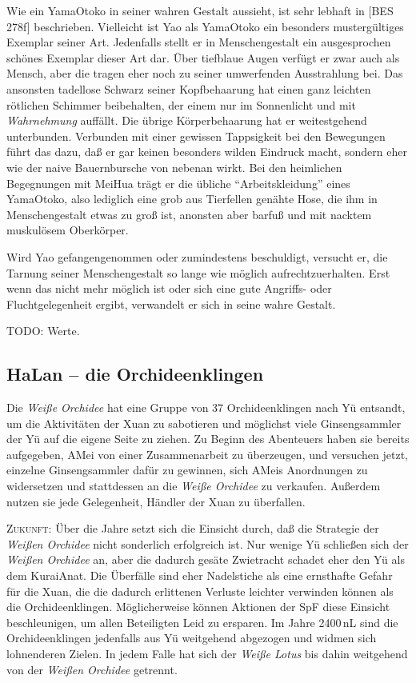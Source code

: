 \documentclass[
a4paper,
twoside,
DIV=calc,
BCOR=4mm,
fontsize=9pt,
twocolumn=on,
titlepage=on,
parskip=half
]{scrartcl}
\begin{document}
Wie ein YamaOtoko in seiner wahren Gestalt aussieht, ist sehr lebhaft
in [BES\,278f] beschrieben. Vielleicht ist Yao als YamaOtoko ein
besonders mustergültiges Exemplar seiner Art. Jedenfalls stellt er in
Menschengestalt ein ausgesprochen schönes Exemplar dieser Art
dar. Über tiefblaue Augen verfügt er zwar auch als Mensch, aber die
tragen eher noch zu seiner umwerfenden Ausstrahlung bei. Das ansonsten
tadellose Schwarz seiner Kopfbehaarung hat einen ganz leichten
rötlichen Schimmer beibehalten, der einem nur im Sonnenlicht und mit
\emph{Wahrnehmung} auffällt. Die übrige Körperbehaarung hat er
weitestgehend unterbunden. Verbunden mit einer gewissen Tappsigkeit
bei den Bewegungen führt das dazu, daß er gar keinen besonders wilden
Eindruck macht, sondern eher wie der naive Bauernbursche von nebenan
wirkt. Bei den heimlichen Begegnungen mit MeiHua trägt er die übliche
"`Arbeitskleidung"' eines YamaOtoko, also lediglich eine grob aus
Tierfellen genähte Hose, die ihm in Menschengestalt etwas zu groß ist,
anonsten aber barfuß und mit nacktem muskulösem Oberkörper.

Wird Yao gefangengenommen oder zumindestens beschuldigt, versucht er,
die Tarnung seiner Menschengestalt so lange wie möglich
aufrechtzuerhalten. Erst wenn das nicht mehr möglich ist oder sich
eine gute Angriffs- oder Fluchtgelegenheit ergibt, verwandelt er sich
in seine wahre Gestalt.

TODO: Werte.

\subsection{HaLan -- die Orchideenklingen}

Die \emph{Weiße Orchidee} hat eine Gruppe von 37 Orchideenklingen nach
Yü entsandt, um die Aktivitäten der Xuan zu sabotieren und möglichst
viele Ginsengsammler der Yü auf die eigene Seite zu ziehen. Zu Beginn
des Abenteuers haben sie bereits aufgegeben, AMei von einer
Zusammenarbeit zu überzeugen, und versuchen jetzt, einzelne
Ginsengsammler dafür zu gewinnen, sich AMeis Anordnungen zu
widersetzen und stattdessen an die \emph{Weiße Orchidee} zu
verkaufen. Außerdem nutzen sie jede Gelegenheit, Händler der Xuan zu
überfallen.

\textsc{Zukunft:} Über die Jahre setzt sich die Einsicht durch, daß
die Strategie der \emph{Weißen Orchidee} nicht sonderlich erfolgreich
ist. Nur wenige Yü schließen sich der \emph{Weißen Orchidee} an, aber
die dadurch gesäte Zwietracht schadet eher den Yü als dem KuraiAnat.
Die Überfälle sind eher Nadelstiche als eine ernsthafte Gefahr für die
Xuan, die die dadurch erlittenen Verluste leichter verwinden können als
die Orchideenklingen. Möglicherweise können Aktionen der SpF diese
Einsicht beschleunigen, um allen Beteiligten Leid zu ersparen. Im
Jahre 2400\,nL sind die Orchideenklingen jedenfalls aus Yü weitgehend
abgezogen und widmen sich lohnenderen Zielen. In jedem Falle hat sich
der \emph{Weiße Lotus} bis dahin weitgehend von der \emph{Weißen
  Orchidee} getrennt.
\end{document}
